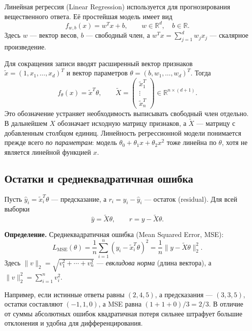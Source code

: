 \documentclass[12pt,a4paper]{article}
\newcommand{\R}{\mathbb{R}}
\begin{document}
Линейная регрессия (Linear Regression) используется для прогнозирования
вещественного ответа. Её простейшая модель имеет вид
\begin{equation}
    f_{w,b}(x)=w^Tx+b,
    \qquad w\in\R^d,\quad b\in\R.
    \label{eq:linreg}
\end{equation}
Здесь $w$ --- вектор весов, $b$ --- свободный член, а
$w^Tx=\sum_{j=1}^dw_jx_j$ --- скалярное произведение.

Для сокращения записи вводят расширенный вектор признаков
$\widetilde x=(1,x_1,\ldots,x_d)^T$ и вектор параметров
$\theta=(b,w_1,\ldots,w_d)^T$. Тогда
\[
    f_\theta(x)=\widetilde x^T\theta,
    \qquad
    \widetilde X=\begin{pmatrix}
    \widetilde x_1^T\\ \vdots\\ \widetilde x_n^T
    \end{pmatrix}\in\R^{n\times(d+1)}.
\]
Это обозначение устраняет необходимость выписывать свободный член
отдельно. В дальнейшем $X$ обозначает исходную матрицу признаков,
а $\widetilde X$ --- матрицу с добавленным столбцом единиц.
Линейность регрессионной модели понимается прежде всего
\emph{по параметрам}: модель $\theta_0+\theta_1x+\theta_2x^2$
тоже линейна по $\theta$, хотя не является линейной функцией $x$.

\subsection{Остатки и среднеквадратичная ошибка}

Пусть $\widehat y_i=\widetilde x_i^T\theta$ --- предсказание,
а $r_i=y_i-\widehat y_i$ --- остаток (residual).
Для всей выборки
\[
    \widehat y=\widetilde X\theta,
    \qquad r=y-\widetilde X\theta.
\]

\textbf{Определение.} Среднеквадратичная ошибка (Mean Squared Error, MSE):
\begin{equation}
    L_{\mathrm{MSE}}(\theta)
    =\frac1n\sum_{i=1}^{n}(y_i-\widetilde x_i^T\theta)^2
    =\frac1n\|y-\widetilde X\theta\|_2^2.
    \label{eq:mse}
\end{equation}
Здесь $\|v\|_2=\sqrt{v_1^2+\cdots+v_n^2}$ ---
\emph{евклидова норма} (длина вектора), а
$\|v\|_2^2=\sum_{i=1}^{n}v_i^2$.

Например, если истинные ответы равны $(2,4,5)$,
а предсказания --- $(3,3,5)$, остатки составляют $(-1,1,0)$,
а MSE равна $(1+1+0)/3=2/3$.
В отличие от суммы абсолютных ошибок квадратичная потеря
сильнее штрафует большие отклонения и удобна для дифференцирования.
\end{document}

